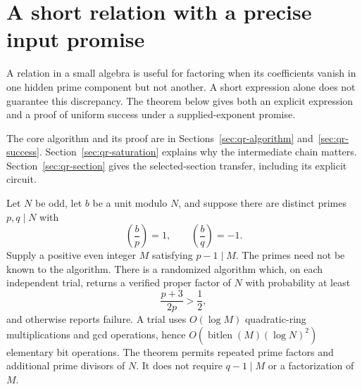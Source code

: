 \begin{abstract}
We study short relations in the quadratic algebra
$(\mathbb Z/N\mathbb Z)[X]/(X^2-b)$.  Suppose $b$ is a square modulo
one prime divisor $p$ of the odd integer $N$, a nonsquare modulo another
prime divisor $q$, and an even supplied exponent $M$ is divisible by
$p-1$.  A coefficient-gcd chain finds a proper factor with probability
at least $(p+3)/(2p)>1/2$, using $O(\log M)$ quadratic-algebra operations.
Other prime factors and arbitrary prime-power multiplicities are
allowed.  The proof continues to work when $M$ annihilates both local
quadratic unit groups, a case in which the one-shot relation can be
uninformative.  For a distinct-prime semiprime, the resulting factor
also constructs the actual selected value and a logarithmic-size
division-free section circuit of an earlier succinct rank-three bundle.
We prove this transfer directly from its chart equations.  The result
is an auxiliary supplied-input theorem, not a new general-factorization
exponent.
\end{abstract}

\tableofcontents

\section{A short relation with a precise input promise}

A relation in a small algebra is useful for factoring when its
coefficients vanish in one hidden prime component but not another.
A short expression alone does not guarantee this discrepancy.
The theorem below gives both an explicit expression and a proof of
uniform success under a supplied-exponent promise.

The core algorithm and its proof are in Sections~\ref{sec:qr-algorithm}
and~\ref{sec:qr-success}.  Section~\ref{sec:qr-saturation} explains why
the intermediate chain matters.  Section~\ref{sec:qr-section} gives the
selected-section transfer, including its explicit circuit.

\begin{theorem}
\label{thm:qr-main}
Let $N$ be odd, let $b$ be a unit modulo $N$, and suppose there are
distinct primes $p,q\mid N$ with
\[
 \left(\frac bp\right)=1,\qquad
 \left(\frac bq\right)=-1.
\]
Supply a positive even integer $M$ satisfying $p-1\mid M$.
The primes need not be known to the algorithm.  There is a randomized
algorithm which, on each independent trial, returns a verified proper
factor of $N$ with probability at least
\[
 \frac{p+3}{2p}>\frac12,
\]
and otherwise reports failure.  A trial uses $O(\log M)$ quadratic-ring
multiplications and gcd operations, hence
$O(\operatorname{bitlen}(M)(\log N)^2)$ elementary bit operations.
The theorem permits repeated prime factors and additional prime divisors
of $N$.  It does not require $q-1\mid M$ or a factorization of $M$.
\end{theorem}

